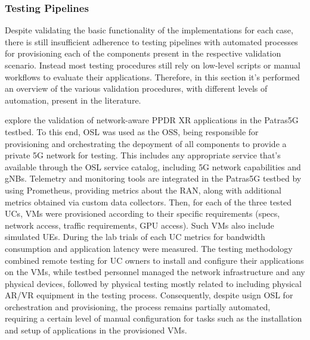 \subsubsection{Testing Pipelines} \label{sec:pipelines}

Despite validating the basic functionality of the implementations for each case, there is still insufficient adherence to testing pipelines with automated processes for provisioning each of the components present in the respective validation scenario. Instead most testing procedures still rely on low-level scripts or manual workflows to evaluate their applications. Therefore, in this section it's performed an overview of the various validation procedures, with different levels of automation, present in the literature.

\citet{ExperiencesChallengesTestingValidatingNetworkAware} explore the validation of network-aware \acs{PPDR} \acs{XR} applications in the Patras\acs{5G} testbed. To this end, \acs{OSL} was used as the \acs{OSS}, being responsible for provisioning and orchestrating the depoyment of all components to provide a private \acs{5G} network for testing. This includes any appropriate service that's available through the \acs{OSL} service catalog, including \acs{5G} network capabilities and \acsp{gNB}. Telemetry and monitoring tools are integrated in the Patras\acs{5G} testbed by using Prometheus, providing metrics about the \acs{RAN}, along with additional metrics obtained via custom data collectors. Then, for each of the three tested \acfp{UC}, \acsp{VM} were provisioned according to their specific requirements (specs, network access, traffic requirements, \acs{GPU} access). Such \acsp{VM} also include simulated \acsp{UE}. During the lab trials of each \acs{UC} metrics for bandwidth consumption and application latency were measured. The testing methodology combined remote testing for \acs{UC} owners to install and configure their applications on the \acsp{VM}, while testbed personnel managed the network infrastructure and any physical devices, followed by physical testing mostly related to including physical \acs{AR}/\acs{VR} equipment in the testing process. Consequently, despite usign \acs{OSL} for orchestration and provisioning, the process remains partially automated, requiring a certain level of manual configuration for tasks such as the installation and setup of applications in the provisioned \acsp{VM}.

